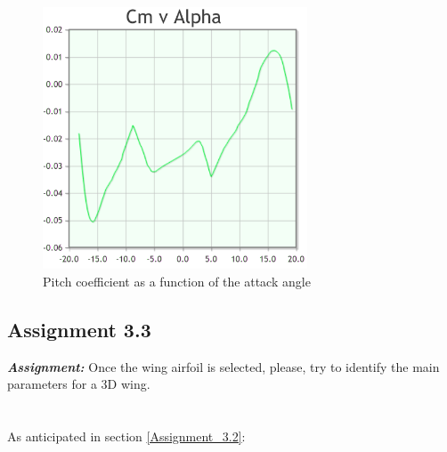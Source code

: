 \documentclass{article}
\begin{document}
\begin{figure}[h!]
    \centering
    \includegraphics[width=0.7\textwidth]{Sources/Plots_and_Pictures/cm_alpha_1412.png}
    \caption{Pitch coefficient as a function of the attack angle \autocite{Airfoiltools}}
    \label{NACA1412}
\end{figure}


\clearpage

\subsection{Assignment 3.3\label{Assignment_3.3}}

\textbf{\textit{Assignment:}} Once the wing airfoil is selected, please, 
try to identify the main parameters for a 3D wing. \\ \\ \\ 

As anticipated in section \ref{Assignment_3.2}: 
\end{document}
